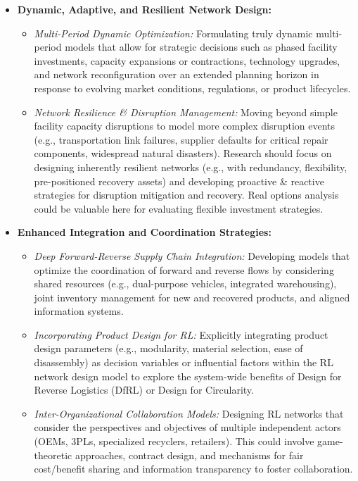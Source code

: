 \begin{itemize}[label=, leftmargin=2mm]
    \item \textbf{Dynamic, Adaptive, and Resilient Network Design:}
        \begin{itemize}
            \item \textit{Multi-Period Dynamic Optimization:} Formulating truly dynamic multi-period models that allow for strategic decisions such as phased facility investments, capacity expansions or contractions, technology upgrades, and network reconfiguration over an extended planning horizon in response to evolving market conditions, regulations, or product lifecycles.
            \item \textit{Network Resilience \& Disruption Management:} Moving beyond simple facility capacity disruptions to model more complex disruption events (e.g., transportation link failures, supplier defaults for critical repair components, widespread natural disasters). Research should focus on designing inherently resilient networks (e.g., with redundancy, flexibility, pre-positioned recovery assets) and developing proactive \& reactive strategies for disruption mitigation and recovery. Real options analysis could be valuable here for evaluating flexible investment strategies.
        \end{itemize}

    \item \textbf{Enhanced Integration and Coordination Strategies:}
        \begin{itemize}
            \item \textit{Deep Forward-Reverse Supply Chain Integration:} Developing models that optimize the coordination of forward and reverse flows by considering shared resources (e.g., dual-purpose vehicles, integrated warehousing), joint inventory management for new and recovered products, and aligned information systems.
            \item \textit{Incorporating Product Design for RL:} Explicitly integrating product design parameters (e.g., modularity, material selection, ease of disassembly) as decision variables or influential factors within the RL network design model to explore the system-wide benefits of Design for Reverse Logistics (DfRL) or Design for Circularity.
            \item \textit{Inter-Organizational Collaboration Models:} Designing RL networks that consider the perspectives and objectives of multiple independent actors (OEMs, 3PLs, specialized recyclers, retailers). This could involve game-theoretic approaches, contract design, and mechanisms for fair cost/benefit sharing and information transparency to foster collaboration.
        \end{itemize}


\end{itemize}
